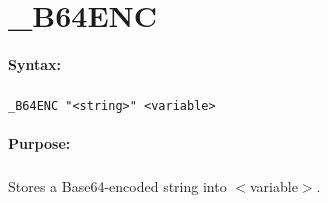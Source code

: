 
\newpage
\section{\_B64ENC}
\label{cmd:_B64ENC}

\paragraph{Syntax:}
\subparagraph{}
\texttt{\_B64ENC "<string>" <variable>}

\paragraph{Purpose:}
\subparagraph{}
Stores a Base64-encoded string into $<$variable$>$.